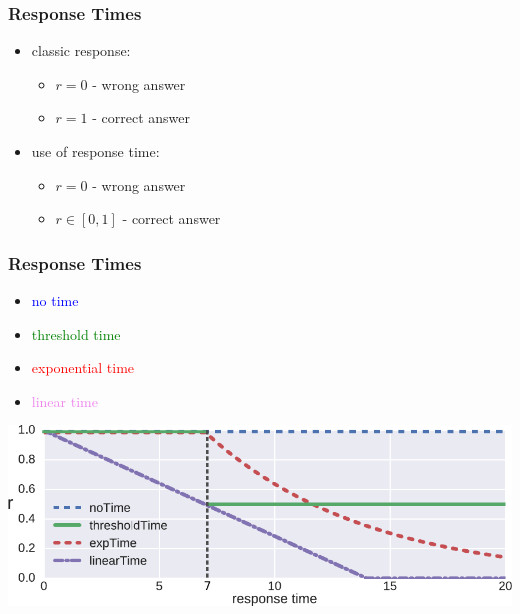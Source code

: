 \documentclass[xcolor=svgnames]{beamer}
\begin{document}
\begin{frame}
    \frametitle{Response Times}

    \begin{itemize}
        \item classic response:
            \begin{itemize}
                \item $r = 0$ - wrong answer
                \item $r = 1$ - correct answer
            \end{itemize}
        \item use of response time:
            \begin{itemize}
                \item $r = 0$ - wrong answer
                \item $r \in [0, 1]$ - correct answer
            \end{itemize}
    \end{itemize}

\end{frame}
\begin{frame}
    \frametitle{Response Times}

    \begin{itemize}
        \item \textcolor{blue}{no time}
        \item \textcolor{green}{threshold time}
        \item \textcolor{red}{exponential time}
        \item \textcolor{violet}{linear time}
    \end{itemize}

    \vfill
    \centering
    \includegraphics[width=0.9\linewidth]{figures/time-uses}

\end{frame}
\end{document}
